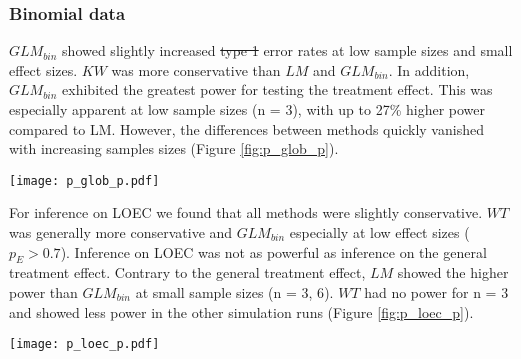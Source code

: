 \documentclass[twocolumn, natbib]{svjour3}
\providecommand{\DIFadd}[1]{{\protect\color{blue}\uwave{#1}}} %
\providecommand{\DIFdel}[1]{{\protect\color{red}\sout{#1}}}                      %
\providecommand{\DIFaddbegin}{} %
\providecommand{\DIFaddend}{} %
\providecommand{\DIFdelbegin}{} %
\providecommand{\DIFdelend}{} %
\providecommand{\DIFaddFL}[1]{\DIFadd{#1}} %
\providecommand{\DIFdelFL}[1]{\DIFdel{#1}} %
\providecommand{\DIFaddbeginFL}{} %
\providecommand{\DIFaddendFL}{} %
\providecommand{\DIFdelbeginFL}{} %
\providecommand{\DIFdelendFL}{} %
\begin{document}
\subsubsection{Binomial data}

$GLM_{bin}$ showed slightly increased \DIFdelbegin \DIFdel{type 1 }\DIFdelend \DIFaddbegin \DIFadd{Type I }\DIFaddend error rates at low sample sizes and small effect sizes.
$KW$ was more conservative than $LM$ and $GLM_{bin}$.
In addition, $GLM_{bin}$ exhibited the greatest power for testing the treatment effect. 
This was especially apparent at low sample sizes (n = 3), with up to 27\% higher power compared to LM.
However, the differences between methods quickly vanished with increasing samples sizes (Figure \ref{fig:p_glob_p}).

\begin{figure*}
  \centering
  \texttt{[image: p\_glob\_p.pdf]}
  \caption{
  Binomial data simulations: 
  Type \DIFdelbeginFL \DIFdelFL{1 }\DIFdelendFL \DIFaddbeginFL \DIFaddFL{I }\DIFaddendFL error (top) and  power (bottom) for the test of a treatment effect. 
  Dashed horizontal line denotes the nominal Type \DIFdelbeginFL \DIFdelFL{1 }\DIFdelendFL \DIFaddbeginFL \DIFaddFL{I }\DIFaddendFL error rate at $\alpha = 0.05$.
  }
  \label{fig:p_glob_p}
\end{figure*}

For inference on LOEC we found that all methods were slightly conservative.
$WT$ was generally more conservative and $GLM_{bin}$ especially at low effect sizes ($p_E > 0.7$).
Inference on LOEC was not as powerful as inference on the general treatment effect.
Contrary to the general treatment effect, $LM$ showed the higher power than $GLM_{bin}$ at small sample sizes (n = {3, 6}).
$WT$ had no power for n = 3 and showed less power in the other simulation runs (Figure \ref{fig:p_loec_p}).

\begin{figure*}
  \centering
  \texttt{[image: p\_loec\_p.pdf]}
  \caption{
  Binomial data simulations: 
  Type \DIFdelbeginFL \DIFdelFL{1 }\DIFdelendFL \DIFaddbeginFL \DIFaddFL{I }\DIFaddendFL error (top) and power (bottom) for the test for determination of LOEC. 
  Dashed horizontal line denotes the nominal Type \DIFdelbeginFL \DIFdelFL{1 }\DIFdelendFL \DIFaddbeginFL \DIFaddFL{I }\DIFaddendFL error rate at $\alpha = 0.05$.
  }
  \label{fig:p_loec_p}
\end{figure*}


\end{document}
